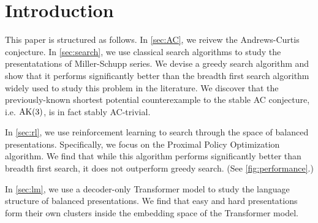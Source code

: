 
\section{Introduction\label{sec:intro}}

This paper is structured as follows. In \autoref{sec:AC}, we reivew the Andrews-Curtis conjecture. In \autoref{sec:search}, we use classical search algorithms to study the presentatations of Miller-Schupp series. We devise a greedy search algorithm and show that it performs significantly better than the breadth first search algorithm widely used to study this problem in the literature. We discover that the previously-known shortest potential counterexample to the stable AC conjecture, i.e. $\text{AK}(3)$, is in fact stably AC-trivial.
\newline 

In \autoref{sec:rl}, we use reinforcement learning to search through the space of balanced presentations. Specifically, we focus on the Proximal Policy Optimization algorithm. We find that while this algorithm performs significantly better than breadth first search, it does not outperform greedy search. (See \autoref{fig:performance}.) 
\newline

In \autoref{sec:lm}, we use a decoder-only Transformer model to study the language structure of balanced presentations. We find that easy and hard presentations form their own clusters inside the embedding space of the Transformer model. 

